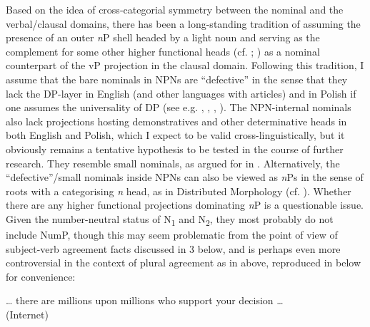 \documentclass[output=paper]{langscibook}
\begin{document}
Based on the idea of cross-categorial symmetry between the nominal and the verbal/clausal domains, there has been a long-standing tradition of assuming the presence of an outer \textit{n}P shell headed by a light noun and serving as the complement for some other higher functional heads (cf. \citealt{Radford2000,Radford2009}; \citealt{Alexiadou.etal2007}) as a nominal counterpart of the vP projection in the clausal domain. Following this tradition, I assume that the bare nominals in NPNs are ``defective'' in the sense that they lack the DP-layer in English (and other languages with articles) and in Polish if one assumes the universality of DP (see e.g. \citealt{Progovac1998}, \citealt{Willim1998}, \citealt{Pereltsvaig2007}, \citealt{Jeong2016}). The NPN-internal nominals also lack projections hosting demonstratives and other determinative heads in both English and Polish, which I expect to be valid cross-linguistically, but it obviously remains a tentative hypothesis to be tested in the course of further research. They resemble  small nominals, as argued for in \citet{Pskit2017}. Alternatively, the ``defective''/small nominals inside NPNs can also be viewed as \textit{n}Ps in the sense of roots with a categorising \textit{n} head, as in Distributed Morphology (cf. \citealt{Halle.Marantz1993,harley1999distributed,Acquaviva2008}). Whether there are any higher functional projections dominating \textit{n}P is a questionable issue. Given the number-neutral status of N\textsubscript{1} and N\textsubscript{2}, they most probably do not include NumP, though this may seem problematic from the point of view of subject-verb agreement facts discussed in 3 below, and is perhaps even more controversial in the context of plural agreement as in  above, reproduced in  below for convenience:

\ea \label{psk:ex:key:16001}  … there are millions upon millions who support your decision   …\vspace{-12pt}\\ \null\hfill(Internet)\\
\z
\end{document}
